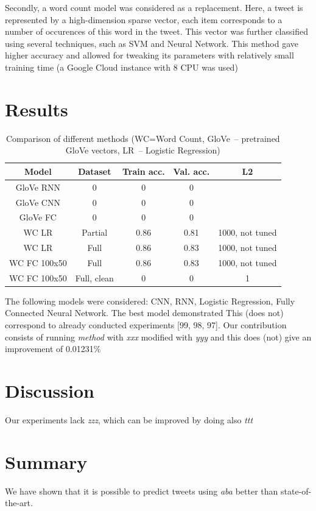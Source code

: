 \documentclass[10pt,conference,compsocconf]{IEEEtran}
\begin{document}
Secondly, a word count model was considered as a replacement.
Here, a tweet is represented by a high-dimension sparse vector, each item corresponds to a number of occurences of this word in the tweet.
This vector was further classified using several techniques, such as SVM and Neural Network.
This method gave higher accuracy and allowed for tweaking its parameters with relatively small training time (a Google Cloud instance with 8 CPU was used)
\section{Results}
\begin{table}[ht]
	\centering
	\tiny
	\begin{tabular}{|c | c |  c | c | c |} 
		\hline
		Model & Dataset & Train acc. & Val. acc. & L2 \\
		\hline
		GloVe RNN & 0 & 0 & 0 &   \\ 
		\hline
		GloVe CNN & 0 & 0 & 0 &  \\
		\hline
		GloVe FC & 0 & 0 & 0 & \\
		\hline
		WC LR & Partial & 0.86 & 0.81 & 1000, not tuned\\
		\hline
		WC LR & Full & 0.86 & 0.83 & 1000, not tuned\\
		\hline
		WC FC 100x50 & Full & 0.86 & 0.83 & 1000, not tuned\\
		\hline
		WC FC 100x50 & Full, clean & 0 & 0 & 1\\ [1ex] 
		\hline
	\end{tabular}
	\caption{Comparison of different methods (WC=Word Count, GloVe~-- pretrained GloVe vectors, LR~-- Logistic Regression)}
	\label{tab:results}
\end{table}

The following models were considered: CNN, RNN, Logistic Regression, Fully Connected Neural Network. The best model demonstrated This (does not) correspond to already conducted experiments [99, 98, 97]. Our contribution consists of running {\em method} with {\em xxx} modified with {\em yyy} and this does (not) give an improvement of 0.01231\%
\section{Discussion}
Our experiments lack {\em zzz}, which can be improved by doing also {\em ttt}
\section{Summary}
We have shown that it is possible to predict tweets using {\em aba} better than state-of-the-art.
\end{document}
